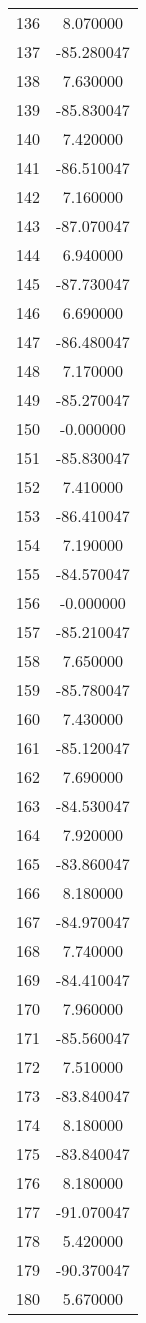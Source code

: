 \documentclass[12pt]{article}
\begin{document}
\begin{longtable}{@{}cc@{}}
136 & 8.070000 \\
137 & -85.280047 \\
138 & 7.630000 \\
139 & -85.830047 \\
140 & 7.420000 \\
141 & -86.510047 \\
142 & 7.160000 \\
143 & -87.070047 \\
144 & 6.940000 \\
145 & -87.730047 \\
146 & 6.690000 \\
147 & -86.480047 \\
148 & 7.170000 \\
149 & -85.270047 \\
150 & -0.000000 \\
151 & -85.830047 \\
152 & 7.410000 \\
153 & -86.410047 \\
154 & 7.190000 \\
155 & -84.570047 \\
156 & -0.000000 \\
157 & -85.210047 \\
158 & 7.650000 \\
159 & -85.780047 \\
160 & 7.430000 \\
161 & -85.120047 \\
162 & 7.690000 \\
163 & -84.530047 \\
164 & 7.920000 \\
165 & -83.860047 \\
166 & 8.180000 \\
167 & -84.970047 \\
168 & 7.740000 \\
169 & -84.410047 \\
170 & 7.960000 \\
171 & -85.560047 \\
172 & 7.510000 \\
173 & -83.840047 \\
174 & 8.180000 \\
175 & -83.840047 \\
176 & 8.180000 \\
177 & -91.070047 \\
178 & 5.420000 \\
179 & -90.370047 \\
180 & 5.670000 \\

\end{longtable}
\end{document}
